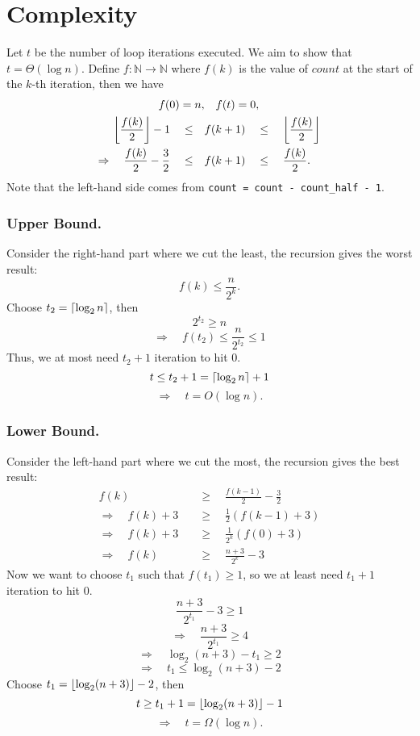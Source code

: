 \documentclass[12pt]{article}
\DeclarePairedDelimiter\ceil{\lceil}{\rceil}
\DeclarePairedDelimiter\floor{\lfloor}{\rfloor}
\begin{document}
\section*{Complexity}

Let \(t\) be the number of loop iterations executed. We aim to show that \(t = \Theta(\log n)\). Define \(f : \mathbb{N} \to \mathbb{N}\) where \(f(k)\) is the value of \(count\) at the start of the \(k\)-th iteration, then we have
\begin{align*}
    f(0) = n, & \quad f(t) = 0, \\
    \floor*{\frac{f(k)}{2}} - 1 \quad \leq \quad & f(k+1) \quad \leq \quad \floor*{\frac{f(k)}{2}} \\
    \Rightarrow \quad \frac{f(k)}{2} - \frac{3}{2} \quad \leq \quad & f(k+1) \quad \leq \quad \frac{f(k)}{2}.
\end{align*}
Note that the left-hand side comes from \verb|count = count - count_half - 1|.

\subsubsection*{Upper Bound.}

Consider the right-hand part where we cut the least, the recursion gives the worst result:
\[
    f(k) \leq \frac{n}{2^k}.
\]
Choose \(t_2 = \ceil{\log_2 n}\), then
\[
    2^{t_2} \geq n
\]
\[
    \Rightarrow \quad f(t_2) \leq \frac{n}{2^{t_2}} \leq 1
\]
Thus, we at most need \(t_2 + 1\) iteration to hit 0.
\[
    t \leq t_2 + 1 = \ceil{\log_2 n} + 1
\]
\[
    \Rightarrow \quad t = O(\log n).
\]

\subsubsection*{Lower Bound.}

Consider the left-hand part where we cut the most, the recursion gives the best result:
\begin{align*}
    f(k) \quad & \geq \quad \frac{f(k-1)}{2} - \frac{3}{2} \\
    \Rightarrow \quad f(k) + 3 \quad & \geq \quad \frac{1}{2} (f(k-1) + 3) \\
    \Rightarrow \quad f(k) + 3 \quad & \geq \quad \frac{1}{2^k} (f(0) + 3) \\
    \Rightarrow \quad f(k) \quad & \geq \quad \frac{n + 3}{2^k} - 3
\end{align*}
Now we want to choose \(t_1\) such that \(f(t_1) \geq 1\), so we at least need \(t_1 + 1\) iteration to hit 0.
\[
    \frac{n + 3}{2^{t_1}} - 3 \geq 1
\]
\[
    \Rightarrow \quad \frac{n + 3}{2^{t_1}} \geq 4
\]
\[
    \Rightarrow \quad \log_2(n + 3) - t_1 \geq 2
\]
\[
    \Rightarrow \quad t_1 \leq \log_2(n + 3) - 2
\]
Choose \(t_1 = \floor*{\log_2(n + 3)} - 2\), then
\[
    t \geq t_1 + 1 = \floor*{\log_2(n + 3)} - 1
\]
\[
    \Rightarrow \quad t = \Omega(\log n).
\]
\end{document}

